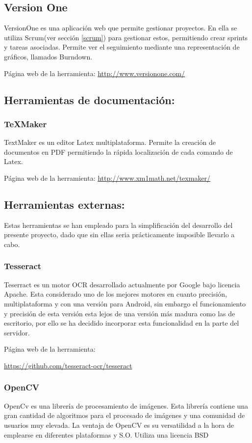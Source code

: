 \subsection{Version One}
VersionOne es una aplicación web que permite gestionar proyectos.
En ella se utiliza Scrum(ver sección \ref{scrum}) para gestionar estos, permitiendo crear sprints y tareas asociadas. Permite ver el seguimiento mediante una representación de gráficos, llamados Burndown.

Página web de la herramienta: \url{http://www.versionone.com/}

\subsection{Herramientas de documentación:}

\subsubsection{\TeX{}Maker}
TextMaker es un editor Latex multiplataforma.
Permite la creación de documentos en PDF permitiendo la rápida localización de cada comando de Latex.

Página web de la herramienta: \url{http://www.xm1math.net/texmaker/}
	
\subsection{Herramientas externas:}
Estas herramientas se han empleado para la simplificación del desarrollo del presente proyecto, dado que sin ellas seria prácticamente imposible llevarlo a cabo.

\subsubsection{Tesseract} \label{Tesseract}
Teserract es un motor OCR desarrollado actualmente por Google bajo licencia Apache.
Esta considerado uno de los mejores motores en cuanto precisión, multiplataforma y con una versión para Android, sin embargo el funcionamiento y precisión de esta versión esta lejos de una versión más madura como las de escritorio, por ello se ha decidido incorporar esta funcionalidad en la parte del servidor.

Página web de la herramienta:
 
\url{https://github.com/tesseract-ocr/tesseract}

\subsubsection{OpenCV}
OpenCv es una librería de procesamiento de imágenes. Esta librería contiene una gran cantidad de algoritmos para el procesado de imágenes y una comunidad de usuarios muy elevada. La ventaja de OpenCV es su versatilidad a la hora de emplearse en diferentes plataformas y S.O. Utiliza una licencia BSD

